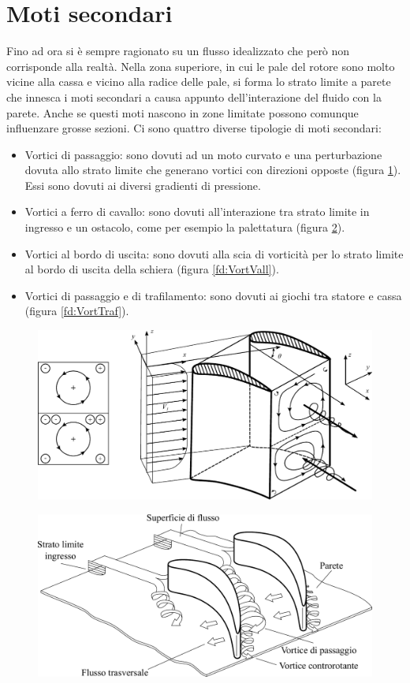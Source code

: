 \section{Moti secondari}
Fino ad ora si è sempre ragionato su un flusso idealizzato che però non corrisponde alla realtà. Nella zona superiore, in cui le pale del rotore sono molto vicine alla cassa e vicino alla radice delle pale, si forma lo strato limite a parete che innesca i moti secondari a causa appunto dell'interazione del fluido con la parete. Anche se questi moti nascono in zone limitate possono comunque influenzare grosse sezioni. Ci sono quattro diverse tipologie di moti secondari:
\begin{itemize}
\item Vortici di passaggio: sono dovuti ad un moto curvato e una perturbazione dovuta allo strato limite che generano vortici con direzioni opposte (figura \ref{fig:VortPass}). Essi sono dovuti ai diversi gradienti di pressione.
\item Vortici a ferro di cavallo: sono dovuti all'interazione tra strato limite in ingresso e un ostacolo, come per esempio la palettatura (figura \ref{fd:VortFerrCav}).
\item Vortici al bordo di uscita: sono dovuti alla scia di vorticità per lo strato limite al bordo di uscita della schiera (figura \ref{fd:VortVall}).
\item Vortici di passaggio e di trafilamento: sono dovuti ai giochi tra statore e cassa (figura \ref{fd:VortTraf}).
\end{itemize}
\begin{figure}[h!]
\centering
  \includegraphics[width=.7\textwidth]{fig/VortPass.pdf}
\caption{}
\label{fig:VortPass}
\end{figure}
\begin{figure}[h!]
\centering
  \includegraphics[width=.7\textwidth]{fig/VortFerrCav.pdf}
\caption{}
\label{fd:VortFerrCav}
\end{figure}
